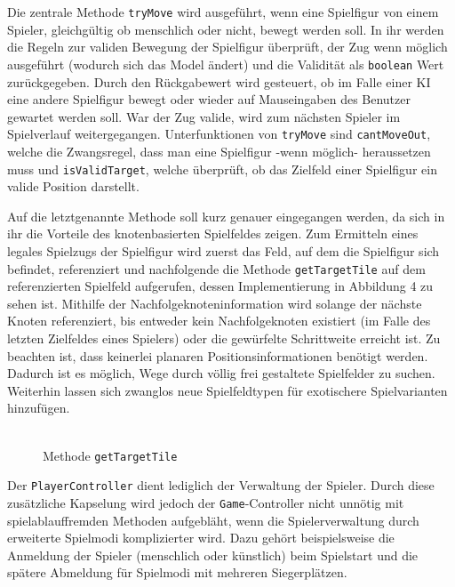 \documentclass[conference]{IEEEtran}
\begin{document}
Die zentrale Methode \texttt{tryMove} wird ausgef\"uhrt, wenn eine Spielfigur von einem Spieler, gleichg\"ultig ob menschlich oder nicht, bewegt werden soll. In ihr werden die Regeln zur validen Bewegung der Spielfigur \"uberpr\"uft, der Zug wenn m\"oglich ausgef\"uhrt (wodurch sich das Model \"andert) und die Validit\"at als \texttt{boolean} Wert zur\"uckgegeben. Durch den R\"uckgabewert wird gesteuert, ob im Falle einer KI eine andere Spielfigur bewegt oder wieder auf Mauseingaben des Benutzer gewartet werden soll. War der Zug valide, wird zum n\"achsten Spieler im Spielverlauf weitergegangen. Unterfunktionen von \texttt{tryMove} sind \texttt{cantMoveOut}, welche die Zwangsregel, dass man eine Spielfigur -wenn m\"oglich- heraussetzen muss und
\texttt{isValidTarget}, welche \"uberpr\"uft, ob das Zielfeld einer Spielfigur ein valide Position darstellt.

Auf die letztgenannte Methode soll kurz genauer eingegangen werden, da sich in ihr die Vorteile des knotenbasierten Spielfeldes zeigen. Zum Ermitteln eines legales Spielzugs der Spielfigur wird zuerst das Feld, auf dem die Spielfigur sich befindet, referenziert und nachfolgende die Methode \texttt{getTargetTile} auf dem referenzierten Spielfeld aufgerufen, dessen Implementierung in Abbildung 4 zu sehen ist. Mithilfe der Nachfolgeknoteninformation wird solange der n\"achste Knoten referenziert, bis entweder kein Nachfolgeknoten existiert (im Falle des letzten Zielfeldes eines Spielers) oder die gew\"urfelte Schrittweite erreicht ist.
Zu beachten ist, dass keinerlei planaren Positionsinformationen ben\"otigt werden. Dadurch ist es m\"oglich, Wege durch v\"ollig frei gestaltete Spielfelder
zu suchen. Weiterhin lassen sich zwanglos neue Spielfeldtypen f\"ur exotischere Spielvarianten hinzuf\"ugen.\\\\
\begin{figure}[]
    \centering
    \caption{Methode \texttt{getTargetTile}}
    \label{gtt}
\end{figure}
Der \texttt{PlayerController} dient lediglich der Verwaltung der Spieler. Durch diese zus\"atzliche Kapselung wird jedoch der \texttt{Game}-Controller
nicht unn\"otig mit spielablauffremden Methoden aufgebl\"aht, wenn die Spielerverwaltung durch erweiterte Spielmodi komplizierter wird. Dazu geh\"ort beispielsweise die Anmeldung der Spieler (menschlich oder k\"unstlich) beim Spielstart und die sp\"atere Abmeldung f\"ur Spielmodi mit mehreren Siegerpl\"atzen.\\
\end{document}
